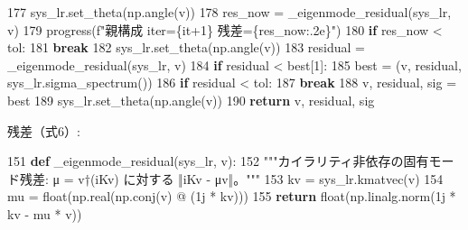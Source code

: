 \documentclass[
  a4paper,
]{ltjsarticle}
\newenvironment{Shaded}{}{}
\newcommand{\BuiltInTok}[1]{\textcolor[rgb]{0.00,0.50,0.00}{#1}}
\newcommand{\ControlFlowTok}[1]{\textcolor[rgb]{0.00,0.44,0.13}{\textbf{#1}}}
\newcommand{\DecValTok}[1]{\textcolor[rgb]{0.25,0.63,0.44}{#1}}
\newcommand{\KeywordTok}[1]{\textcolor[rgb]{0.00,0.44,0.13}{\textbf{#1}}}
\newcommand{\NormalTok}[1]{#1}
\newcommand{\OperatorTok}[1]{\textcolor[rgb]{0.40,0.40,0.40}{#1}}
\newcommand{\OtherTok}[1]{\textcolor[rgb]{0.00,0.44,0.13}{#1}}
\newcommand{\SpecialCharTok}[1]{\textcolor[rgb]{0.25,0.44,0.63}{#1}}
\newcommand{\SpecialStringTok}[1]{\textcolor[rgb]{0.73,0.40,0.53}{#1}}
\newcommand{\StringTok}[1]{\textcolor[rgb]{0.25,0.44,0.63}{#1}}
\begin{document}
\begin{Shaded}
\begin{Highlighting}[]
   \DecValTok{177}\NormalTok{                  sys\_lr.set\_theta(np.angle(v))}
   \DecValTok{178}\NormalTok{                  res\_now }\OperatorTok{=}\NormalTok{ \_eigenmode\_residual(sys\_lr, v)}
   \DecValTok{179}\NormalTok{                  progress(}\SpecialStringTok{f"親構成 iter=}\SpecialCharTok{\{}\NormalTok{it}\OperatorTok{+}\DecValTok{1}\SpecialCharTok{\}}\SpecialStringTok{ 残差=}\SpecialCharTok{\{}\NormalTok{res\_now}\SpecialCharTok{:.2e\}}\SpecialStringTok{"}\NormalTok{)}
   \DecValTok{180}                  \ControlFlowTok{if}\NormalTok{ res\_now }\OperatorTok{\textless{}}\NormalTok{ tol:}
   \DecValTok{181}                      \ControlFlowTok{break}
   \DecValTok{182}\NormalTok{          sys\_lr.set\_theta(np.angle(v))}
   \DecValTok{183}\NormalTok{          residual }\OperatorTok{=}\NormalTok{ \_eigenmode\_residual(sys\_lr, v)}
   \DecValTok{184}          \ControlFlowTok{if}\NormalTok{ residual }\OperatorTok{\textless{}}\NormalTok{ best[}\DecValTok{1}\NormalTok{]:}
   \DecValTok{185}\NormalTok{              best }\OperatorTok{=}\NormalTok{ (v, residual, sys\_lr.sigma\_spectrum())}
   \DecValTok{186}          \ControlFlowTok{if}\NormalTok{ residual }\OperatorTok{\textless{}}\NormalTok{ tol:}
   \DecValTok{187}              \ControlFlowTok{break}
   \DecValTok{188}\NormalTok{      v, residual, sig }\OperatorTok{=}\NormalTok{ best}
   \DecValTok{189}\NormalTok{      sys\_lr.set\_theta(np.angle(v))}
   \DecValTok{190}      \ControlFlowTok{return}\NormalTok{ v, residual, sig}
\end{Highlighting}
\end{Shaded}

残差（式6）:

\begin{Shaded}
\begin{Highlighting}[]
   \DecValTok{151}  \KeywordTok{def}\NormalTok{ \_eigenmode\_residual(sys\_lr, v):}
   \DecValTok{152}      \StringTok{"""カイラリティ非依存の固有モード残差: μ = v†(iKv) に対する ‖iKv {-} μv‖。"""}
   \DecValTok{153}\NormalTok{      kv }\OperatorTok{=}\NormalTok{ sys\_lr.kmatvec(v)}
   \DecValTok{154}\NormalTok{      mu }\OperatorTok{=} \BuiltInTok{float}\NormalTok{(np.real(np.conj(v) }\OperatorTok{@}\NormalTok{ (}\OtherTok{1j} \OperatorTok{*}\NormalTok{ kv)))}
   \DecValTok{155}      \ControlFlowTok{return} \BuiltInTok{float}\NormalTok{(np.linalg.norm(}\OtherTok{1j} \OperatorTok{*}\NormalTok{ kv }\OperatorTok{{-}}\NormalTok{ mu }\OperatorTok{*}\NormalTok{ v))}
\end{Highlighting}
\end{Shaded}
\end{document}
